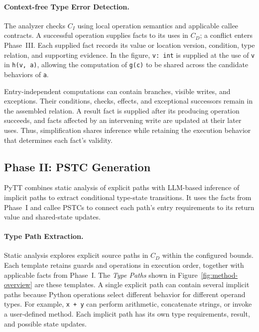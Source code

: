 \paragraph{Context-free Type Error Detection.}
The analyzer checks $C_I$ using local operation semantics and applicable
callee contracts. A successful operation supplies facts to its uses in
$C_D$; a conflict enters Phase~III. Each supplied fact records its value
or location version, condition, type relation, and supporting evidence.
In the figure, \texttt{v: int} is supplied at the use of \texttt{v} in
\texttt{h(v, a)}, allowing the computation of \texttt{g(c)} to be shared
across the candidate behaviors of \texttt{a}.

Entry-independent computations can contain branches, visible writes, and
exceptions. Their conditions, checks, effects, and exceptional successors
remain in the assembled relation. A result fact is supplied after its
producing operation succeeds, and facts affected by an intervening write
are updated at their later uses. Thus, simplification shares inference
while retaining the execution behavior that determines each fact's validity.

\subsection{Phase II: PSTC Generation}
\label{sec:pstc-generation}
PyTT combines static analysis of explicit paths with LLM-based inference
of implicit paths to extract conditional type-state transitions. It uses
the facts from Phase~I and callee PSTCs to connect each path's entry
requirements to its return value and shared-state updates.

\paragraph{Type Path Extraction.}
Static analysis explores explicit source paths in $C_D$ within the configured
bounds. Each template retains guards and operations in execution order,
together with applicable facts from Phase~I. The \emph{Type Paths} shown
in Figure~\ref{fig:method-overview} are these templates. A single explicit
path can contain several implicit paths because Python operations select
different behavior for different operand types. For example,
\texttt{x + y} can perform arithmetic, concatenate strings, or invoke a
user-defined method. Each implicit path has its own type requirements,
result, and possible state updates.


